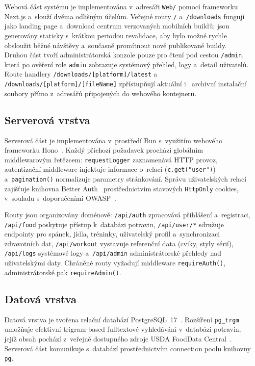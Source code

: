 {\sloppy
Webová část systému je implementována v~adresáři \texttt{Web/} pomocí
frameworku Next.js a~slouží dvěma odlišným účelům. Veřejné routy
\texttt{/} a~\texttt{/downloads} fungují jako landing page a~download
centrum verzovaných mobilních buildů; jsou generovány staticky
s~krátkou periodou revalidace, aby bylo možné rychle obsloužit běžné
návštěvy a~současně promítnout nově publikované buildy. Druhou část
tvoří administrátorská konzole pouze pro čtení pod cestou \texttt{/admin},
která po ověření role \texttt{admin} zobrazuje systémový přehled,
logy a~detail uživatelů. Route handlery
\texttt{/downloads/[platform]/latest} a~
\texttt{/downloads/[platform]/[fileName]} zpřístupňují aktuální i~
archivní instalační soubory přímo z~adresářů připojených do webového
kontejneru.
}

\subsection{Serverová vrstva}

Serverová část je implementována v~prostředí Bun s~využitím webového frameworku
Hono~\cite{hono2024}. Každý příchozí požadavek prochází globálním middlewarovým řetězcem:
\texttt{requestLogger} zaznamenává HTTP provoz, autentizační middleware injektuje informace
o~relaci (\texttt{c.get("user")}) a~\texttt{pagination()} normalizuje parametry stránkování.
Správu uživatelských relací zajišťuje knihovna Better Auth~\cite{betterauth2024} prostřednictvím
stavových \texttt{HttpOnly} cookies, v~souladu s~doporučeními OWASP~\cite{owasp2024mobile}.

Routy jsou organizovány doménově: \texttt{/api/auth} zpracovává přihlášení a~registraci,
\texttt{/api/food} poskytuje přístup k~databázi potravin, \texttt{/api/user/*} sdružuje
endpointy pro spánek, jídla, tréninky, uživatelský profil a~synchronizaci
zdravotních dat, \texttt{/api/workout} vystavuje referenční data (cviky, styly sérií),
\texttt{/api/logs} systémové logy a~\texttt{/api/admin} administrátorské přehledy nad
uživatelskými daty. Chráněné routy vyžadují middleware \texttt{requireAuth()},
administrátorské pak \texttt{requireAdmin()}.

\subsection{Datová vrstva}

Datová vrstva je tvořena relační databází PostgreSQL~17~\cite{postgresql2024}.
Rozšíření \texttt{pg\_trgm}~\cite{pg_trgm2024} umožňuje efektivní trigram-based
fulltextové vyhledávání v~databázi potravin, jejíž obsah pochází z~veřejně dostupného
zdroje USDA FoodData Central~\cite{usda2024}. Serverová část komunikuje s~databází
prostřednictvím connection poolu knihovny \texttt{pg}.

